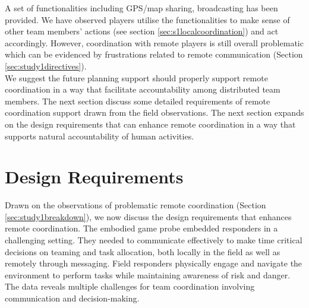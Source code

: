 A set of functionalities including GPS/map sharing, broadcasting has been provided. We have observed players utilise the functionalities to make sense of other team members' actions (see section \ref{sec:s1localcoordination}) and act accordingly. However, coordination with remote players is still overall problematic which can be evidenced by frustrations related to remote communication (Section \ref{sec:study1directives}).\\

We suggest the future planning support should properly support remote coordination in a way that facilitate accountability among distributed team members. The next section discuss some detailed requirements of remote coordination support drawn from the field observations. The next section expands on the design requirements that can enhance remote coordination in a way that supports natural accountability of human activities.\\


\section{Design Requirements}\label{sec:study1requirements}
Drawn on the observations of problematic remote coordination (Section \ref{sec:study1breakdown}), we now discuss the design requirements that enhances remote coordination. The embodied game probe embedded responders in a challenging setting. They needed to communicate effectively to make time critical decisions on teaming and task allocation, both locally in the field as well as remotely through messaging. Field responders physically engage and navigate the environment to perform tasks while maintaining awareness of risk and danger. The data reveals multiple challenges for team coordination involving communication and decision-making. \\


